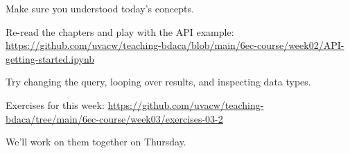 \documentclass[compress]{beamer}
\begin{document}
\begin{frame}[standout]

Make sure you understood today’s concepts.

Re-read the chapters and play with the API example:  
\url{https://github.com/uvacw/teaching-bdaca/blob/main/6ec-course/week02/API-getting-started.ipynb}

Try changing the query, looping over results, and inspecting data types.

Exercises for this week:  
\url{https://github.com/uvacw/teaching-bdaca/tree/main/6ec-course/week03/exercises-03-2}

We’ll work on them together on Thursday.
\end{frame}

\begin{frame}
  \printbibliography
\end{frame}
\end{document}
